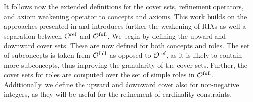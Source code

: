 
It follows now the extended definitions for the cover sets, refinement operators, and axiom weakening operator to \SROIQ concepts and axioms. This work builds on the approaches presented in \cite{confalonieri2020towards} and introduces further the weakening of RIAs as well a separation between ${\mathcal{O}^\textnormal{ref}}$ and ${\mathcal{O}^\textnormal{full}}$. We begin by defining the upward and downward cover sets. These are now defined for both concepts and roles. The set of subconcepts is taken from ${\mathcal{O}^\textnormal{full}}$ as opposed to ${\mathcal{O}^\textnormal{ref}}$, as it is likely to contain more subconcepts, thus improving the granularity of the cover sets. Further, the cover sets for roles are computed over the set of simple roles in ${\mathcal{O}^\textnormal{full}}$. Additionally, we define the upward and downward cover also for non-negative integers, as they will be useful for the refinement of cardinality constraints.


